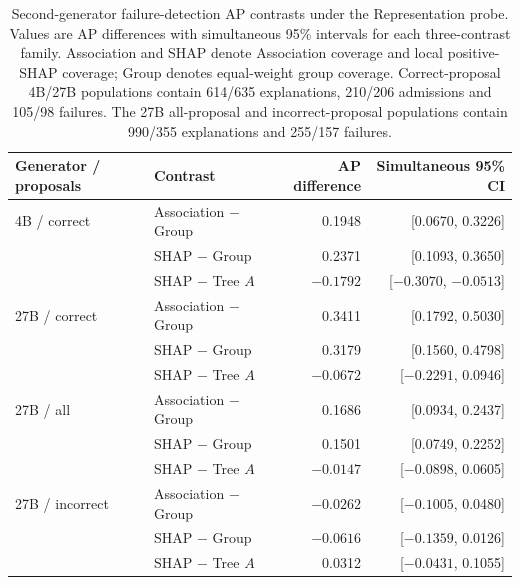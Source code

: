 \begin{table}[!tbp]\centering\footnotesize
\caption{Second-generator failure-detection AP contrasts under the Representation probe. Values are AP differences with simultaneous 95\% intervals for each three-contrast family. Association and SHAP denote Association coverage and local positive-SHAP coverage; Group denotes equal-weight group coverage. Correct-proposal 4B/27B populations contain 614/635 explanations, 210/206 admissions and 105/98 failures. The 27B all-proposal and incorrect-proposal populations contain 990/355 explanations and 255/157 failures.}\label{tab:second-generator}
\begin{tabular}{llrr}\toprule
Generator / proposals & Contrast & AP difference & Simultaneous 95\% CI\\\midrule
4B / correct & Association $-$ Group & 0.1948 & [0.0670, 0.3226]\\
 & SHAP $-$ Group & 0.2371 & [0.1093, 0.3650]\\
 & SHAP $-$ Tree $A$ & $-0.1792$ & [$-0.3070$, $-0.0513$]\\\midrule
27B / correct & Association $-$ Group & 0.3411 & [0.1792, 0.5030]\\
 & SHAP $-$ Group & 0.3179 & [0.1560, 0.4798]\\
 & SHAP $-$ Tree $A$ & $-0.0672$ & [$-0.2291$, 0.0946]\\\midrule
27B / all & Association $-$ Group & 0.1686 & [0.0934, 0.2437]\\
 & SHAP $-$ Group & 0.1501 & [0.0749, 0.2252]\\
 & SHAP $-$ Tree $A$ & $-0.0147$ & [$-0.0898$, 0.0605]\\\midrule
27B / incorrect & Association $-$ Group & $-0.0262$ & [$-0.1005$, 0.0480]\\
 & SHAP $-$ Group & $-0.0616$ & [$-0.1359$, 0.0126]\\
 & SHAP $-$ Tree $A$ & 0.0312 & [$-0.0431$, 0.1055]\\
\bottomrule\end{tabular}\end{table}
